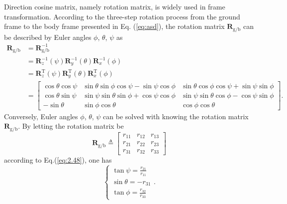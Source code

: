 Direction cosine matrix, namely rotation matrix, is widely used in
frame transformation. According to the three-step rotation process
from the ground frame to the body frame presented in Eq. (\ref{eq:asd}),
the rotation matrix ${{\mathbf{R}}_{{\text{g}}/{\text{b}}}}$ can
be described by Euler angles $\phi$, $\theta$, $\psi$ as 
\begin{equation}
\begin{aligned}
{{\mathbf{R}}_{{\text{{g}/{b}}}}}&=\mathbf{R}_{{\text{{g}/{b}}}}^{-1}\\
&=\mathbf{R}_{z}^{-1}\left(\psi\right)\mathbf{R}_{y}^{-1}\left(\theta\right)\mathbf{R}_{x}^{-1}\left(\phi\right)\\
&=\mathbf{R}_{z}^{\text{T}}\left(\psi\right)\mathbf{R}_{y}^{\text{T}}\left(\theta\right)\mathbf{R}_{x}^{\text{T}}\left(\phi\right)\\
&=\left[\begin{array}{ccc}
\cos\theta\cos\psi & \sin\theta\sin\phi\cos\psi-\sin\psi\cos\phi & \sin\theta\cos\phi\cos\psi+\sin\psi\sin\phi\\
\cos\theta\sin\psi & \sin\psi\sin\theta\sin\phi+\cos\psi\cos\phi & \sin\psi\sin\theta\cos\phi-\cos\psi\sin\phi\\
-\sin\theta & \sin\phi\cos\theta & \cos\phi\cos\theta
\end{array}\right].
\end{aligned}\label{eq:2.48}
\end{equation}
Conversely, Euler angles $\phi$, $\theta$, $\psi$ can be solved
with knowing the rotation matrix ${{\mathbf{R}}_{\text{{g}/{b}}}}$.
By letting the rotation matrix be
\begin{equation}
{{\mathbf{R}}_{\text{{g}/{b}}}}\triangleq\left[\begin{array}{ccc}
r_{11} & {{r}_{12}} & {{r}_{13}}\\
{{r}_{21}} & {{r}_{22}} & {{r}_{23}}\\
{{r}_{31}} & {{r}_{32}} & {{r}_{33}}
\end{array}\right]\label{eq:2.49}
\end{equation}
according to Eq.(\ref{eq:2.48}), one has
\begin{equation}
\left\{ \begin{array}{l}
\tan\psi=\frac{{{r}_{21}}}{{{r}_{11}}}\\
\sin\theta=-{{r}_{31}}\\
\tan\phi=\frac{{{r}_{32}}}{{{r}_{33}}}
\end{array}\right..\label{eq:2.50}
\end{equation}
